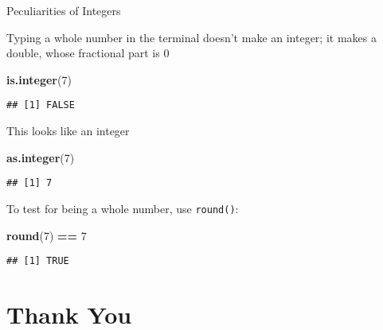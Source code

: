 \documentclass[8pt,ignorenonframetext,]{beamer}
\newenvironment{Shaded}{\begin{snugshade}}{\end{snugshade}}
\newcommand{\KeywordTok}[1]{\textcolor[rgb]{0.13,0.29,0.53}{\textbf{#1}}}
\newcommand{\DecValTok}[1]{\textcolor[rgb]{0.00,0.00,0.81}{#1}}
\newcommand{\StringTok}[1]{\textcolor[rgb]{0.31,0.60,0.02}{#1}}
\newcommand{\OperatorTok}[1]{\textcolor[rgb]{0.81,0.36,0.00}{\textbf{#1}}}
\newcommand{\NormalTok}[1]{#1}
\begin{document}
\begin{frame}[fragile]{Peculiarities of Integers}

Typing a whole number in the terminal doesn't make an integer; it makes
a double, whose fractional part is 0

\begin{Shaded}
\begin{Highlighting}[]
\KeywordTok{is.integer}\NormalTok{(}\DecValTok{7}\NormalTok{)}
\end{Highlighting}
\end{Shaded}

\begin{verbatim}
## [1] FALSE
\end{verbatim}

This looks like an integer

\begin{Shaded}
\begin{Highlighting}[]
\KeywordTok{as.integer}\NormalTok{(}\DecValTok{7}\NormalTok{)}
\end{Highlighting}
\end{Shaded}

\begin{verbatim}
## [1] 7
\end{verbatim}

To test for being a whole number, use \texttt{round()}:

\begin{Shaded}
\begin{Highlighting}[]
\KeywordTok{round}\NormalTok{(}\DecValTok{7}\NormalTok{) }\OperatorTok{==}\StringTok{ }\DecValTok{7}
\end{Highlighting}
\end{Shaded}

\begin{verbatim}
## [1] TRUE
\end{verbatim}

\end{frame}

\section{Thank You}\label{thank-you}
\end{document}

